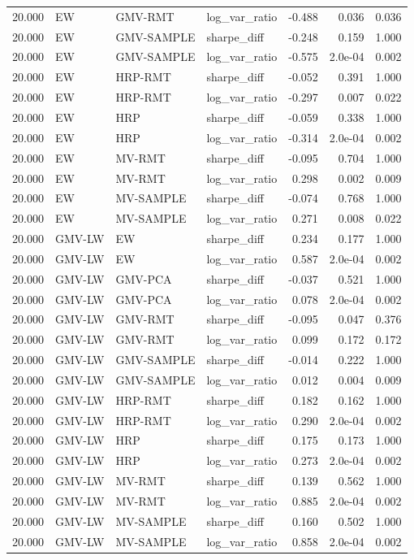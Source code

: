 \begin{table}[t]
{\begin{tabular}{rlllrrr}
20.000 & EW & GMV-RMT & log\_var\_ratio & -0.488 & 0.036 & 0.036 \\
20.000 & EW & GMV-SAMPLE & sharpe\_diff & -0.248 & 0.159 & 1.000 \\
20.000 & EW & GMV-SAMPLE & log\_var\_ratio & -0.575 & 2.0e-04 & 0.002 \\
20.000 & EW & HRP-RMT & sharpe\_diff & -0.052 & 0.391 & 1.000 \\
20.000 & EW & HRP-RMT & log\_var\_ratio & -0.297 & 0.007 & 0.022 \\
20.000 & EW & HRP & sharpe\_diff & -0.059 & 0.338 & 1.000 \\
20.000 & EW & HRP & log\_var\_ratio & -0.314 & 2.0e-04 & 0.002 \\
20.000 & EW & MV-RMT & sharpe\_diff & -0.095 & 0.704 & 1.000 \\
20.000 & EW & MV-RMT & log\_var\_ratio & 0.298 & 0.002 & 0.009 \\
20.000 & EW & MV-SAMPLE & sharpe\_diff & -0.074 & 0.768 & 1.000 \\
20.000 & EW & MV-SAMPLE & log\_var\_ratio & 0.271 & 0.008 & 0.022 \\
20.000 & GMV-LW & EW & sharpe\_diff & 0.234 & 0.177 & 1.000 \\
20.000 & GMV-LW & EW & log\_var\_ratio & 0.587 & 2.0e-04 & 0.002 \\
20.000 & GMV-LW & GMV-PCA & sharpe\_diff & -0.037 & 0.521 & 1.000 \\
20.000 & GMV-LW & GMV-PCA & log\_var\_ratio & 0.078 & 2.0e-04 & 0.002 \\
20.000 & GMV-LW & GMV-RMT & sharpe\_diff & -0.095 & 0.047 & 0.376 \\
20.000 & GMV-LW & GMV-RMT & log\_var\_ratio & 0.099 & 0.172 & 0.172 \\
20.000 & GMV-LW & GMV-SAMPLE & sharpe\_diff & -0.014 & 0.222 & 1.000 \\
20.000 & GMV-LW & GMV-SAMPLE & log\_var\_ratio & 0.012 & 0.004 & 0.009 \\
20.000 & GMV-LW & HRP-RMT & sharpe\_diff & 0.182 & 0.162 & 1.000 \\
20.000 & GMV-LW & HRP-RMT & log\_var\_ratio & 0.290 & 2.0e-04 & 0.002 \\
20.000 & GMV-LW & HRP & sharpe\_diff & 0.175 & 0.173 & 1.000 \\
20.000 & GMV-LW & HRP & log\_var\_ratio & 0.273 & 2.0e-04 & 0.002 \\
20.000 & GMV-LW & MV-RMT & sharpe\_diff & 0.139 & 0.562 & 1.000 \\
20.000 & GMV-LW & MV-RMT & log\_var\_ratio & 0.885 & 2.0e-04 & 0.002 \\
20.000 & GMV-LW & MV-SAMPLE & sharpe\_diff & 0.160 & 0.502 & 1.000 \\
20.000 & GMV-LW & MV-SAMPLE & log\_var\_ratio & 0.858 & 2.0e-04 & 0.002 \\
\bottomrule
\end{tabular}}
\end{table}

